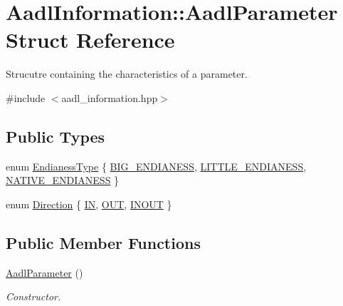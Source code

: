 \hypertarget{structAadlInformation_1_1AadlParameter}{}\section{Aadl\+Information\+:\+:Aadl\+Parameter Struct Reference}
\label{structAadlInformation_1_1AadlParameter}


Strucutre containing the characteristics of a parameter.  




{\ttfamily \#include $<$aadl\+\_\+information.\+hpp$>$}

\subsection*{Public Types}
\begin{DoxyCompactItemize}
\item 
enum \hyperlink{structAadlInformation_1_1AadlParameter_a1b095cc6220ca218732206b6c3994192}{Endianess\+Type} \{ \hyperlink{structAadlInformation_1_1AadlParameter_a1b095cc6220ca218732206b6c3994192a0acd5b43ee3b6209bbcb45500f0b253a}{B\+I\+G\+\_\+\+E\+N\+D\+I\+A\+N\+E\+SS}, 
\hyperlink{structAadlInformation_1_1AadlParameter_a1b095cc6220ca218732206b6c3994192a99dca0a2aa5e037c36c67417237523c0}{L\+I\+T\+T\+L\+E\+\_\+\+E\+N\+D\+I\+A\+N\+E\+SS}, 
\hyperlink{structAadlInformation_1_1AadlParameter_a1b095cc6220ca218732206b6c3994192a9bfc82aafde2ce17176fab7b9b6aad9b}{N\+A\+T\+I\+V\+E\+\_\+\+E\+N\+D\+I\+A\+N\+E\+SS}
 \}
\item 
enum \hyperlink{structAadlInformation_1_1AadlParameter_a4f3dba322ae2eb8ecec6f6199f81a77e}{Direction} \{ \hyperlink{structAadlInformation_1_1AadlParameter_a4f3dba322ae2eb8ecec6f6199f81a77ead4291ef91dc52c3a3f214305cc6d3210}{IN}, 
\hyperlink{structAadlInformation_1_1AadlParameter_a4f3dba322ae2eb8ecec6f6199f81a77ea29866d2dc18fc236e0982a558bdb2fa1}{O\+UT}, 
\hyperlink{structAadlInformation_1_1AadlParameter_a4f3dba322ae2eb8ecec6f6199f81a77ea16616bbcef44af1cafe932eb9f55353e}{I\+N\+O\+UT}
 \}
\end{DoxyCompactItemize}
\subsection*{Public Member Functions}
\begin{DoxyCompactItemize}
\item 
\hyperlink{structAadlInformation_1_1AadlParameter_a0055be51ef0f5c3bbca5ba76ad38a0f1}{Aadl\+Parameter} ()
\begin{DoxyCompactList}\small\item\em Constructor. \end{DoxyCompactList}\end{DoxyCompactItemize}

